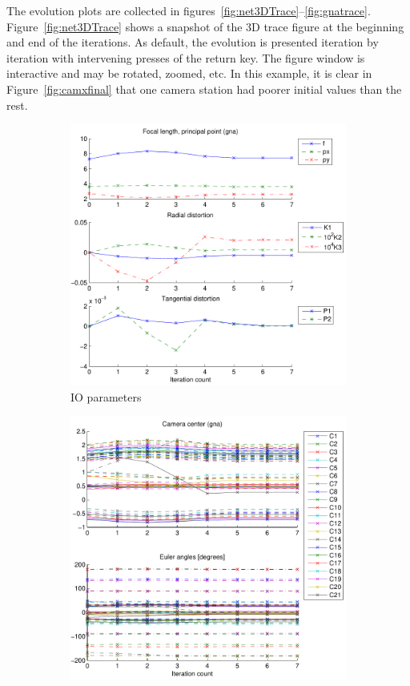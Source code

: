 \documentclass{article}
\begin{document}
The evolution plots are collected in
figures~\ref{fig:net3DTrace}--\ref{fig:gnatrace}.
Figure~\ref{fig:net3DTrace} shows a snapshot of the 3D trace figure at
the beginning and end of the iterations. As default, the evolution is
presented iteration by iteration with intervening presses of the
return key. The figure window is interactive and may be rotated,
zoomed, etc. In this example, it is clear in
Figure~\ref{fig:camxfinal} that one camera station had poorer initial
values than the rest.

\begin{figure}
  \centering
  \begin{subfigure}[b]{0.3\textwidth}
    \includegraphics[width=\textwidth]{ill/ccamiotrace}
    \caption{IO parameters}
    \label{fig:IOtrace}
  \end{subfigure}%
  \begin{subfigure}[b]{0.3\textwidth}
    \includegraphics[width=\textwidth]{ill/ccameotrace}

\end{subfigure}
\end{figure}
\end{document}
